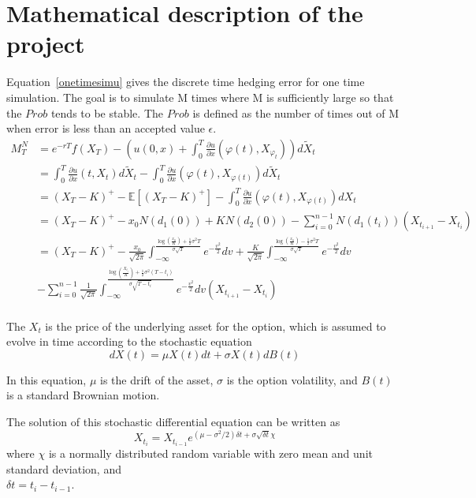 \documentclass{article}
\begin{document}
\section*{Mathematical description of the project}
Equation~\ref{onetimesimu} gives the discrete time hedging error for one time simulation. The goal is to simulate M times where M is 
sufficiently large so that the $Prob$ tends to be stable. The $Prob$ is defined as the number of times out of M when error is less than 
an accepted value $\epsilon$. 
\begin{equation}
\label{onetimesimu}
\begin{split}
M_T^N
&=e^{-rT}f(X_T)-(u(0,x)+\int_0^T\frac{\partial u}{\partial x}(\varphi(t), 
X_{\varphi_t}))d\widetilde{X}_t\\
&=\int_0^T\frac{\partial u}{\partial x}(t, X_t)d\widetilde{X}_t-\int_0^T\frac{\partial u}{\partial x}(\varphi(t), X_{\varphi(t)})d\widetilde{X}_t\\
&=(X_T-K)^+-\mathbb{E}[(X_T-K)^+]-\int_0^T\frac{\partial u}{\partial x}(\varphi(t), X_{\varphi(t)})dX_t\\
&=(X_T-K)^+-x_0N(d_1(0))+KN(d_2(0))-\sum_{i=0}^{n-1}N(d_1(t_i))(X_{t_{i+1}}-X_{t_i})\\
&=(X_T-K)^+-\frac{x_0}{\sqrt{2\pi}}\int_{-\infty}^{\frac{\log(\frac{x_0}{K})+\frac{1}{2}\sigma^2T}
{\sigma\sqrt{T}}}e^{-\frac{v^2}{2}}dv+\frac{K}{\sqrt{2\pi}}\int_{-\infty}^{\frac{\log(\frac{x_0}{K})-\frac{1}{2}\sigma^2T}{\sigma\sqrt{T}}}e^{-\frac{v^2}{2}}dv\\
&-\sum_{i=0}^{n-1}\frac{1}{\sqrt{2\pi}}\int_{-\infty}^{\frac{\log(\frac{X_{t_i}}{K})+\frac{1}{2}\sigma^2(T-t_i)}{\sigma\sqrt{T-t_i}}}e^{-\frac{v^2}{2}}dv(X_{t_{i+1}}-X_{t_i})\\
\end{split}
\end{equation}

The $X_{t}$ is the price of the underlying asset for the option, which is assumed to evolve in time according to the stochastic equation
\begin{equation}
  dX(t) = \mu X(t)dt + \sigma X(t)dB(t)
\end{equation}

In this equation, $\mu$ is the drift of the asset, $\sigma$ is the option volatility, and $B(t)$ is a standard Brownian motion.

The solution of this stochastic differential equation can be written as 
\begin{equation}
  X_{t_i}=X_{t_{i-1}}e^{(\mu-\sigma^2/2)\delta t+\sigma\sqrt{\delta t}\chi}
\end{equation}
where $\chi$ is a normally distributed random variable with zero mean and unit standard deviation, and \\$\delta t = t_i - t_{i-1}$.
\end{document}
